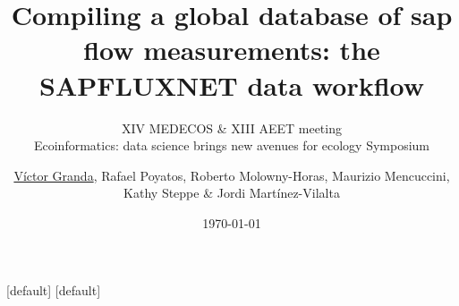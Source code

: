 \usepackage{textpos}
\usepackage{fontspec}

\setsansfont{Raleway}
\setmainfont{Sanchez}

\title[The SAPFLUXNET Data Workflow]{Compiling a global database of sap flow measurements: the SAPFLUXNET data workflow}
\subtitle{XIV MEDECOS \& XIII AEET meeting\\Ecoinformatics: data science brings new avenues for ecology Symposium}
\author[Víctor Granda \emph{et al.}]{\underline{Víctor Granda}, Rafael Poyatos, Roberto Molowny-Horas, Maurizio Mencuccini, Kathy Steppe \& Jordi Martínez-Vilalta}
\date{\today}


[default]
[default]